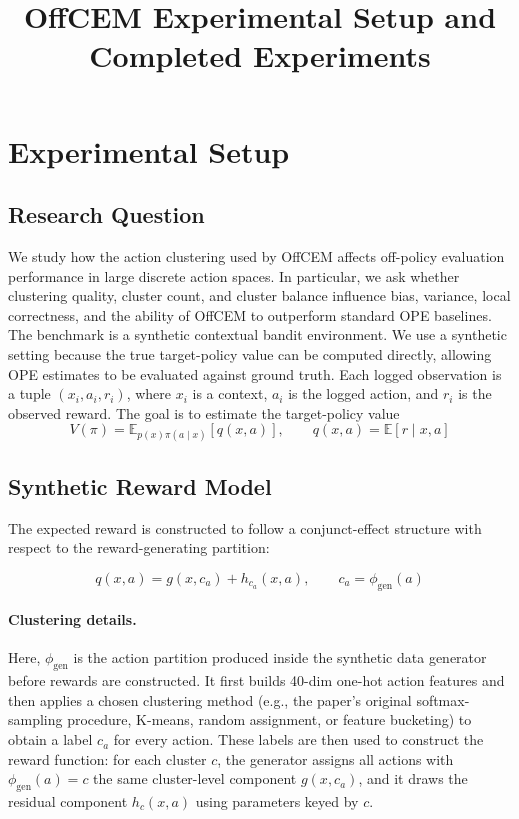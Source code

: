 \documentclass[11pt]{article}
\title{OffCEM Experimental Setup and Completed Experiments}
\begin{document}
\maketitle

\section{Experimental Setup}

\subsection{Research Question}

We study how the action clustering used by OffCEM affects off-policy evaluation performance in large discrete action spaces. In particular, we ask whether clustering quality, cluster count, and cluster balance influence bias,
variance, local correctness, and the ability of OffCEM to outperform standard OPE baselines.
The benchmark is a synthetic contextual bandit environment. We use a synthetic setting because the true target-policy value can be computed directly, allowing OPE estimates to be evaluated against ground truth. Each logged observation is a tuple $(x_i,a_i,r_i)$, where $x_i$ is a context, $a_i$ is the logged action, and $r_i$ is the observed reward. The goal is to estimate the target-policy value
$$V(\pi)=\mathbb{E}_{p(x)\pi(a\mid x)}[q(x,a)], \qquad q(x,a)=\mathbb{E}[r\mid x,a]$$

\subsection{Synthetic Reward Model}
The expected reward is constructed to follow a conjunct-effect structure with respect to the reward-generating partition:

$$q(x,a)=g(x,c_a)+h_{c_a}(x,a), \qquad c_a=\phi_{\mathrm{gen}}(a)$$

\paragraph{Clustering details.} Here, \(\phi_{\mathrm{gen}}\) is the action partition produced inside the synthetic data generator before rewards are constructed. It first builds 40-dim one-hot action features and then applies a chosen clustering method (e.g., the paper's original softmax-sampling procedure, K-means, random assignment, or feature bucketing) to obtain a label \(c_a\) for every action. These labels are then used to construct the reward function: for each cluster $c$, the generator assigns all actions with  $\phi_{\mathrm{gen}}(a)=c$ the same cluster-level component $g(x,c_a)$, and it draws the residual component $h_c(x,a)$ using parameters keyed by $c$. 
\end{document}
